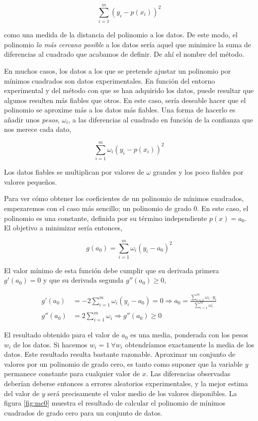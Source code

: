 \begin{equation*}
\sum_{i=1}^m \left(y_i-p(x_i)\right)^2
\end{equation*}
\begin{paracol}{2}
\noindent como una medida de la distancia del polinomio a los datos.  De este modo,  el polinomio \emph{lo más cercano posible}  a los datos sería aquel que minimice la suma de diferencias al cuadrado que acabamos de definir. De ahí el nombre del método.

En muchos casos, los datos a los que se pretende ajustar un polinomio por mínimos cuadrados son datos experimentales. En función del entorno experimental y del método con que se han adquirido los datos, puede resultar que algunos resulten más fiables que otros. En este caso, sería deseable hacer que el polinomio se aproxime más a los datos más fiables. Una forma de hacerlo es añadir unos \emph{pesos}, $\omega_i$, a las diferencias al  cuadrado en función de la confianza que nos merece cada dato,
\end{paracol}
\begin{equation*}
\sum_{i=1}^m \omega_i \left(y_i-p(x_i)\right)^2
\end{equation*}
\begin{paracol}{2}
Los datos fiables se multiplican por valores de $\omega$ grandes y los poco fiables por valores pequeños.

Para ver cómo obtener los coeficientes de un polinomio de mínimos cuadrados, empezaremos con el caso más sencillo; un polinomio de grado $0$. En este caso, el polinomio es una constante, definida por su término independiente $p(x)=a_0$. El objetivo a minimizar sería entonces,
\end{paracol}
\begin{equation*}
g(a_0)=\sum_{i=1}^m \omega_i \left(y_i-a_0\right)^2
\end{equation*}
\begin{paracol}{2}
El valor mínimo de esta función debe cumplir que su derivada primera $g'(a_0)=0$ y que su derivada segunda  $g''(a_0)\geq 0$,
\end{paracol}
\begin{align*}
g'(a_0)&=-2\sum_{i=1}^m \omega_i \left(y_i-a_0\right)=0 \Rightarrow a_0=\frac{\sum_{i=1}^m \omega_i\cdot y_i}{ \sum_{i=1}^m \omega_i}\\
g''(a_0)&=2\sum_{i=1}^m \omega_i \Rightarrow  g''(a_0) \geq 0
\end{align*}
\begin{paracol}{2}
El resultado obtenido para el valor de $a_0$ es una media, ponderada con los pesos $w_i$ de los datos. Si hacemos $w_i=1 \ \forall w_i$ obtendríamos exactamente la media de los datos. Este resultado resulta bastante razonable. Aproximar un conjunto de valores por un polinomio de grado cero, es tanto como suponer que la variable $y$ permanece constante para cualquier valor de $x$. Las diferencias observadas deberían deberse entonces a errores aleatorios experimentales, y la mejor estima del valor de $y$ será precisamente el valor medio de los valores disponibles. La figura \ref{fig:mc0} muestra el resultado de  calcular el polinomio de mínimos cuadrados de grado cero para un conjunto de datos.
\end{paracol}
